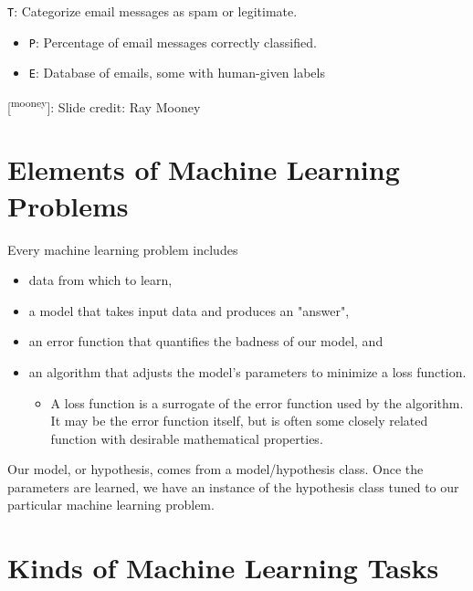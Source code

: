 \documentclass[11pt]{article}
\begin{document}
\texttt{T}: Categorize email messages as spam or legitimate.

\begin{itemize}
\item \texttt{P}: Percentage of email messages correctly classified.
\item \texttt{E}: Database of emails, some with human-given labels
\end{itemize}

{[}\textsuperscript{mooney}]: Slide credit: Ray Mooney
\section{Elements of Machine Learning Problems}
\label{sec:orgf90c1dd}

Every machine learning problem includes

\begin{itemize}
\item data from which to learn,
\item a model that takes input data and produces an "answer",
\item an error function that quantifies the badness of our model, and
\item an algorithm that adjusts the model’s parameters to minimize a loss function.
\begin{itemize}
\item A loss function is a surrogate of the error function used by the algorithm.  It may be the error function itself, but is often some closely related function with desirable mathematical properties.
\end{itemize}
\end{itemize}

Our model, or hypothesis, comes from a model/hypothesis class.  Once the parameters are learned, we have an instance of the hypothesis class tuned to our particular machine learning problem.
\section{Kinds of Machine Learning Tasks}
\label{sec:orgbb6a3e6}
\end{document}
